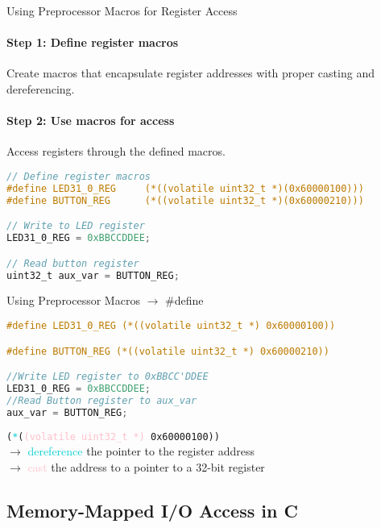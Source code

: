 \begin{KR}{Using Preprocessor Macros for Register Access}
\paragraph{Step 1: Define register macros}
Create macros that encapsulate register addresses with proper casting and dereferencing.
\paragraph{Step 2: Use macros for access}
Access registers through the defined macros.

\begin{lstlisting}[language=C, style=basesmol]
// Define register macros
#define LED31_0_REG     (*((volatile uint32_t *)(0x60000100)))
#define BUTTON_REG      (*((volatile uint32_t *)(0x60000210)))

// Write to LED register
LED31_0_REG = 0xBBCCDDEE;

// Read button register
uint32_t aux_var = BUTTON_REG;
\end{lstlisting}
\end{KR}

\begin{examplecode}{Using Preprocessor Macros} $\rightarrow$ \#define
\begin{lstlisting}[language=C, style=basesmol]
#define LED31_0_REG (*((volatile uint32_t *) 0x60000100))

#define BUTTON_REG (*((volatile uint32_t *) 0x60000210))

//Write LED register to 0xBBCC'DDEE
LED31_0_REG = 0xBBCCDDEE;
//Read Button register to aux_var
aux_var = BUTTON_REG;
\end{lstlisting}
    \vspace{2mm}
    \texttt{(\textcolor{darkturquoise}{*}(\textcolor{pink}{(volatile\ uint32\_t *)} 0x60000100))}\\
    $\rightarrow$ \textcolor{darkturquoise}{dereference} the pointer to the register address\\
    $\rightarrow$ \textcolor{pink}{cast} the address to a pointer to a 32-bit register
\end{examplecode}

\subsection{Memory-Mapped I/O Access in C}

